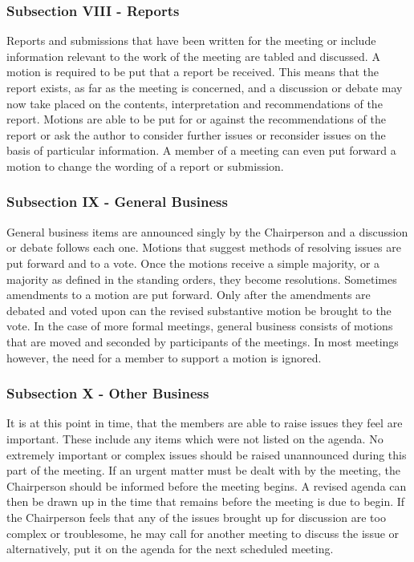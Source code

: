 \documentclass[11pt]{article}
\begin{document}
\subsubsection{Subsection VIII - Reports}
\label{sec:org4896263}

Reports and submissions that have been written for the meeting or include information relevant to the work of the meeting are tabled and discussed. 
A motion is required to be put that a report be received. 
This means that the report exists, as far as the meeting is concerned, and a discussion or debate may now take placed on the contents, interpretation and recommendations of the report. 
Motions are able to be put for or against the recommendations of the report or ask the author to consider further issues or reconsider issues on the basis of particular information.
A member of a meeting can even put forward a motion to change the wording of a report or submission.

\subsubsection{Subsection IX - General Business}
\label{sec:orgeaf7b94}

General business items are announced singly by the Chairperson and a discussion or debate follows each one. 
Motions that suggest methods of resolving issues are put forward and to a vote. 
Once the motions receive a simple majority, or a majority as defined in the standing orders, they become resolutions. 
Sometimes amendments to a motion are put forward. 
Only after the amendments are debated and voted upon can the revised substantive motion be brought to the vote. 
In the case of more formal meetings, general business consists of motions that are moved and seconded by participants of the meetings. 
In most meetings however, the need for a member to support a motion is ignored.

\subsubsection{Subsection X - Other Business}
\label{sec:orgf5c02a5}

It is at this point in time, that the members are able to raise issues they feel are important. 
These include any items which were not listed on the agenda. 
No extremely important or complex issues should be raised unannounced during this part of the meeting. 
If an urgent matter must be dealt with by the meeting, 
the Chairperson should be informed before the meeting begins. 
A revised agenda can then be drawn up in the time that remains before the meeting is due to begin. 
If the Chairperson feels that any of the issues brought up for discussion are too complex or troublesome, 
he may call for another meeting to discuss the issue or 
alternatively, put it on the agenda for the next scheduled meeting.
\end{document}
